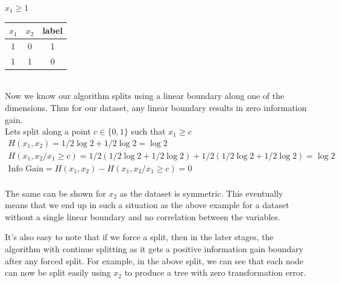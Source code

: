 \documentclass[a4paper]{article}
\theoremstyle{definition}
\newenvironment{soln}{
    \leavevmode\color{blue}\ignorespaces
}{}
\begin{document}
\begin{enumerate}
\begin{soln}
\begin{minipage}{0.3\linewidth}
        
        $x_1\geq 1$\\
        \begin{tabular}{|c|c|c|}
            \hline
            $x_1$ & $x_2$ & label \\
            \hline
            1 & 0 & 1 \\
            1 & 1 & 0 \\
            \hline
        \end{tabular}
    \end{minipage}\\
    Now we know our algorithm splits using a linear boundary along one of the dimensions. Thus for our dataset, any linear boundary results in zero information gain.\\ Lets split along a point $c \in \{0,1\}$ such that $x_1 \geq c$
    \begin{gather*}
        H(x_1,x_2) = 1/2\log{2}+1/2\log{2} = \log{2}\\
        H(x_1,x_2/x_1\geq c) = 1/2(1/2\log{2}+1/2\log{2}) + 1/2(1/2\log{2}+1/2\log{2}) = \log{2}\\
        \text{Info Gain} = H(x_1,x_2) - H(x_1,x_2/x_1\geq c) = 0
    \end{gather*}\\
   The same can be shown for $x_2$ as the dataset is symmetric. This eventually means that we end up in such a situation as the above example for a dataset without a single linear boundary and no correlation between the variables.

    It's also easy to note that if we force a split, then in the later stages, the algorithm with continue splitting as it gets a positive information gain boundary after any forced split. For example, in the above split, we can see that each node can now be split easily using $x_2$ to produce a tree with zero transformation error.
\end{soln}


\end{enumerate}
\end{document}
